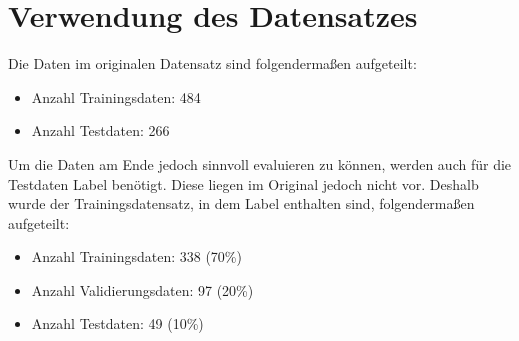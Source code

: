 \section{Verwendung des Datensatzes}
\label{Usage}
Die Daten im originalen Datensatz sind folgendermaßen aufgeteilt:
\begin{itemize}
\item Anzahl Trainingsdaten: 484
\item Anzahl Testdaten: 266
\end{itemize}

Um die Daten am Ende jedoch sinnvoll evaluieren zu können, werden auch für die Testdaten Label benötigt. Diese liegen im Original jedoch nicht vor. Deshalb wurde der Trainingsdatensatz, in dem Label enthalten sind, folgendermaßen aufgeteilt:

\begin{itemize}
\item Anzahl Trainingsdaten: 338 (70\%)
\item Anzahl Validierungsdaten: 97 (20\%)
\item Anzahl Testdaten: 49 (10\%)
\end{itemize}

